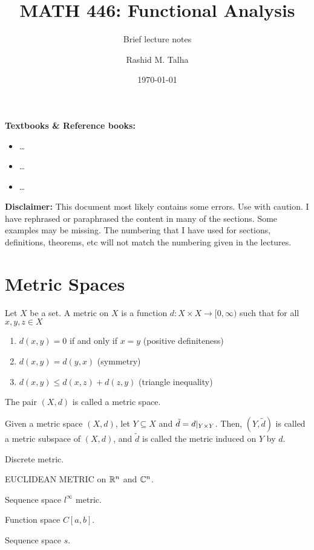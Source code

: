 \documentclass[11pt]{penrose}
\title{MATH 446: Functional Analysis}
\subtitle{Brief lecture notes}
\author{Rashid M. Talha}
\affiliation{School of Natural Sciences, NUST}
\date{\today}
\begin{document}
\maketitle

\textbf{Textbooks \& Reference books:}
\begin{itemize}
    \item \dots
    \item \dots
    \item \dots
\end{itemize}

\textbf{Disclaimer:} This document most likely contains some errors. Use with caution. I have rephrased or paraphrased the content in many of the sections. Some examples may be missing. The numbering that I have used for sections, definitions, theorems, etc will not match the numbering given in the lectures.

\section{Metric Spaces}
\begin{ndfn}
    Let $X$ be a set. A metric on $X$ is a function $d : X \times X \to [0,\infty)$ such that for all $x, y, z \in X$
    \begin{enumerate}
        \item $d(x,y) = 0$ if and only if $x = y$ \hfill (positive definiteness)
        \item $d(x,y) = d(y,x)$ \hfill (symmetry)
        \item $d(x,y) \leq d(x,z) + d(z,y)$ \hfill (triangle inequality)
    \end{enumerate}
    The pair $(X,d)$ is called a metric space.
\end{ndfn}

\begin{ndfn}
    Given a metric space $(X,d)$, let $Y \subseteq X$ and $\tilde{d} = d \at{Y \times Y}$. Then, $(Y,\tilde{d})$ is called a metric subspace of $(X,d)$, and $\tilde{d}$ is called the metric induced on $Y$ by $d$.
\end{ndfn}

Discrete metric.

EUCLIDEAN METRIC on $\mathbb{R}^n$ and $\mathbb{C}^n$.

Sequence space $l^{\infty}$ metric.

Function space $C[a,b]$.

Sequence space $s$.
\end{document}
